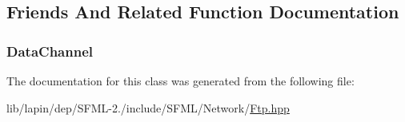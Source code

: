 \subsection{Friends And Related Function Documentation}
\hypertarget{classsf_1_1_ftp_aafee9e6471e9ba6590613dc367c65503}{
\subsubsection[{Data\-Channel}]{\setlength{\rightskip}{0pt plus 5cm}Data\-Channel\hspace{0.3cm}{\ttfamily [friend]}}}\label{classsf_1_1_ftp_aafee9e6471e9ba6590613dc367c65503}


The documentation for this class was generated from the following file\-:\begin{DoxyCompactItemize}
\item 
lib/lapin/dep/\-S\-F\-M\-L-\/2./include/\-S\-F\-M\-L/\-Network/\hyperlink{lapin_2dep_2_s_f_m_l-2_83_2include_2_s_f_m_l_2_network_2_ftp_8hpp}{Ftp.\-hpp}\end{DoxyCompactItemize}
